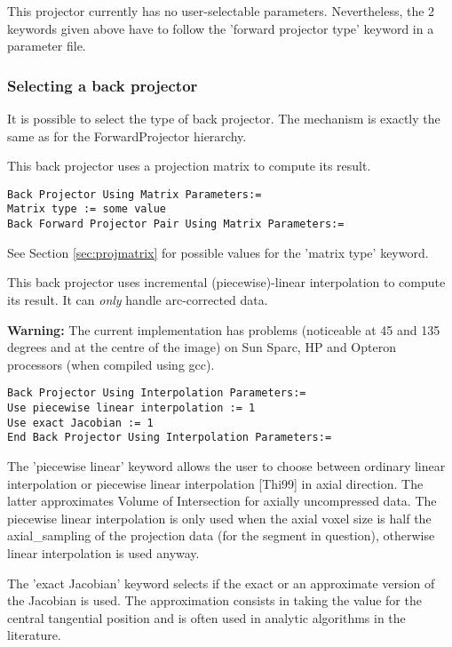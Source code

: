 \documentclass{article}
\begin{document}
This projector currently has no user-selectable parameters. Nevertheless, 
the 2 keywords given above have to follow the 'forward projector 
type' keyword in a parameter file.


\subsubsection{
Selecting a back projector}
\label{sec:backprojectors}
It is possible to select the type of back projector. The mechanism 
is exactly the same as for the ForwardProjector hierarchy.

{ 
}

This back projector uses a projection matrix to compute its result.

{ 
}
\begin{verbatim}
Back Projector Using Matrix Parameters:=
Matrix type := some value
Back Forward Projector Pair Using Matrix Parameters:=
\end{verbatim}

See Section \ref{sec:projmatrix} for possible values for the 'matrix type' keyword.

{ 
}

This back projector uses incremental (piecewise)-linear interpolation 
to compute its result. It can \textit{only} handle arc-corrected data.


\textbf{Warning:} The current implementation has problems (noticeable 
at 45 and 135 degrees and at the centre of the image) on Sun 
Sparc, HP and Opteron processors (when compiled using gcc).

{ 
}
\begin{verbatim}
Back Projector Using Interpolation Parameters:=
Use piecewise linear interpolation := 1
Use exact Jacobian := 1
End Back Projector Using Interpolation Parameters:=
\end{verbatim}

The 'piecewise linear' keyword allows the user to choose between 
ordinary linear interpolation or piecewise linear interpolation 
[Thi99] in axial direction. The latter approximates Volume of 
Intersection for axially uncompressed data. The piecewise linear 
interpolation is only used when the axial voxel size is half 
the axial\_sampling of the projection data (for the segment in 
question), otherwise linear interpolation is used anyway.


The 'exact Jacobian' keyword selects if the exact or an approximate 
version of the Jacobian is used. The approximation consists in 
taking the value for the central tangential position and is often 
used in analytic algorithms in the literature.
\end{document}
